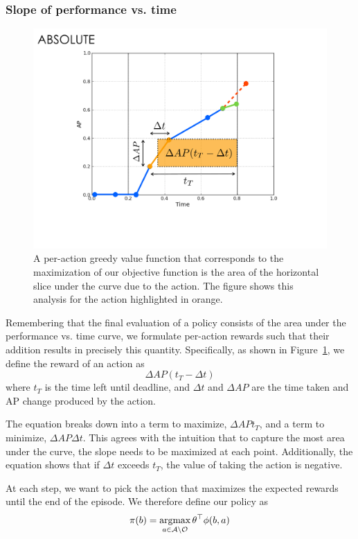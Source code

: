 \documentclass[runningheads]{llncs}
\begin{document}
\subsubsection{Slope of performance vs. time}
\begin{figure}[htb]
  \centering
  \includegraphics[width=0.56\linewidth]{figures/apvst_expl.pdf}
  \caption{A per-action greedy value function that corresponds to the maximization of our objective function is the area of the horizontal slice under the curve due to the action. The figure shows this analysis for the action highlighted in orange.}
  \label{fig:rewards}
\end{figure}

Remembering that the final evaluation of a policy consists of the area under the performance vs. time curve, we formulate per-action rewards such that their addition results in precisely this quantity.
Specifically, as shown in Figure~\ref{fig:rewards}, we define the reward of an action as
\begin{equation}\label{eq:advanced}
\Delta AP (t_T-\Delta t)
\end{equation}
where $t_T$ is the time left until deadline, and $\Delta t$ and $\Delta AP$ are the time taken and AP change produced by the action.

The equation breaks down into a term to maximize, $\Delta AP t_T$, and a term to minimize, $\Delta AP \Delta t$.
This agrees with the intuition that to capture the most area under the curve, the slope needs to be maximized at each point.
Additionally, the equation shows that if $\Delta t$ exceeds $t_T$, the value of taking the action is negative.

At each step, we want to pick the action that maximizes the expected rewards until the end of the episode.
We therefore define our policy as
\begin{equation}
\pi(b) = \argmax_{a \in \mathcal{A} \setminus \mathcal{O}} \theta^\top \phi(b,a)
\end{equation}
\end{document}
